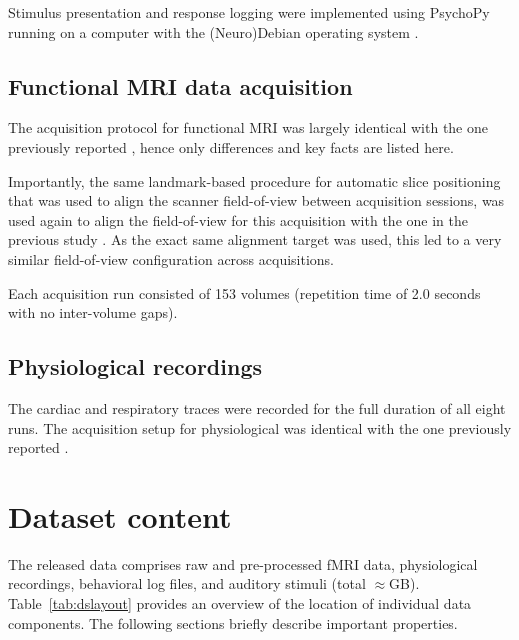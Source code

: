 Stimulus presentation and response logging were implemented using PsychoPy
\cite{Pie2007}  running on a computer with the (Neuro)Debian operating system
\cite{HH12}.

\subsection*{Functional MRI data acquisition}

The acquisition protocol for functional MRI was largely identical with the one
previously reported \cite{HBI+14}, hence only differences and key facts are
listed here.

Importantly, the same landmark-based procedure for automatic slice positioning
that was used to align the scanner field-of-view between acquisition sessions,
was used again to align the field-of-view for this acquisition with the one in
the previous study \cite{HBI+14}. As the exact same alignment target was
used, this led to a very similar field-of-view configuration across
acquisitions.

Each acquisition run consisted of 153 volumes (repetition time of 2.0 seconds
with no inter-volume gaps).

\subsection*{Physiological recordings}

The cardiac and respiratory traces were recorded for the full duration of all
eight runs. The acquisition setup for physiological was identical with the one
previously reported \cite{HBI+14}.

\section*{Dataset content}

The released data comprises raw and pre-processed fMRI data, physiological
recordings, behavioral log files, and auditory stimuli (total
$\approx$\unit[95]{GB}). Table~\ref{tab:dslayout} provides an overview of the
location of individual data components. The following sections briefly describe
important properties.

